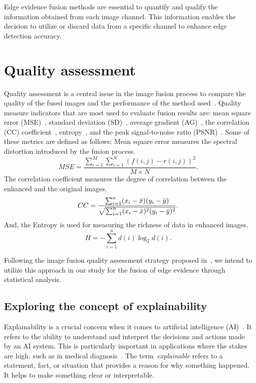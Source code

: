 \documentclass{article}
\begin{document}
Edge evidence fusion methods are essential to quantify and qualify the information obtained from each image channel. This information enables the decision to utilize or discard data from a specific channel to enhance edge detection accuracy.
\section{Quality assessment}
Quality assessment is a central issue in the image fusion process to compare the quality of the fused images and the performance of the method used~\cite{Somvanshi2017}. Quality measure indicators that are most used to evaluate fusion results are:  mean square error (MSE)~\cite{beaulieu2003multi}, standard deviation (SD)~\cite{choi2003biorthogonal}, average gradient (AG)~\cite{li2005color}, the correlation (CC) coefficient~\cite{aiazzi2004spectral}, entropy~\cite{han2008study}, and the peak signal-to-noise ratio (PSNR)~\cite{canga2005}. Some of these metrics are defined as follows: Mean square error measures the spectral distortion introduced by the fusion process.
    $$MSE= \displaystyle \frac{\sum_{i=1}^{M}\sum_{i=1}^{N}(f(i,j)-r(i,j))^2}{M\times N}.$$
The correlation coefficient measures the degree of correlation between the enhanced and the original images.
    $$CC=  \frac{\sum_{i=1}^{n}(x_i-\Bar{x})(y_i-\Bar{y})}{\sqrt{\sum_{i=1}^{n}(x_i-\Bar{x})^2(y_i-\Bar{y})^2}}.$$
And, the Entropy is used for measuring the richness of data in enhanced images.
    $$H=-\sum_{i=1}^{n}d(i)\log_2d(i).$$

Following the image fusion quality assessment strategy proposed in~\cite{Li2010, Somvanshi2017,Nikola2015}, we intend to utilize this approach in our study for the fusion of edge evidence through statistical analysis.



\subsection{Exploring the concept of explainability}
Explainability is a crucial concern when it comes to artificial intelligence (AI)~\cite{Vilone2021}. It refers to the ability to understand and interpret the decisions and actions made by an AI system. This is particularly important in applications where the stakes are high, such as in medical diagnosis~\cite{Tjoa2021}. The term~\textit{explainable} refers to a statement, fact, or situation that provides a reason for why something happened. It helps to make something clear or interpretable.
\end{document}
